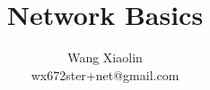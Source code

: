 \graphicspath{{./figs/}{./figs/imgs/}} %






\newcommand\googlelogo{\raisebox{-3pt}{\texttt{[image: google]}}}
\newcommand\wikipedialogo{\texttt{[image: wikipedia]}\ }
\newcommand\Tcpip{\fontspec[Scale=3,Color=gray]{DejaVu Sans Mono}{TCP/IP}}
\newcommand\tcpip{\fontspec[Scale=1]{DejaVu Sans Mono}{TCP/IP}}


\title{Network Basics}
\author{Wang Xiaolin\\{\footnotesize\ttfamily wx672ster+net@gmail.com}}

